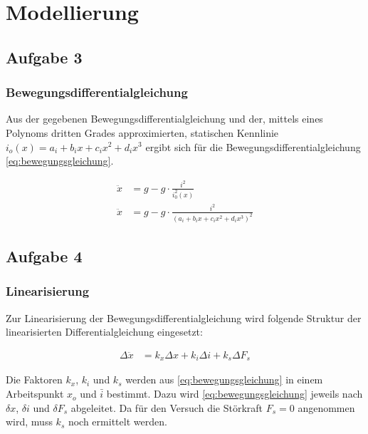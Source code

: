 \newcommand{\laplace}{%
  \tikz[baseline={(base)}, inner sep=0pt, outer sep=0pt]{
    \node[circle, fill, inner sep=1.5pt] (solid) at (0,0) {};
    \node[draw, circle, inner sep=1.5pt] (hollow) at (0,.5) {};
    \draw (solid) -- (hollow);
    \coordinate (base) at (0,0);
  }
}

\chapter{Modellierung}\label{chap:Modellierung}
\section{Aufgabe 3}\label{sec:Aufgabe3}
	\subsection*{Bewegungsdifferentialgleichung}\label{sub:diffeq}
	Aus der gegebenen Bewegungsdifferentialgleichung und der, mittels eines Polynoms dritten Grades approximierten, statischen Kennlinie $i_o(x) = a_i + b_ix +c_ix^2 + d_ix^3$ ergibt sich für die Bewegungsdifferentialgleichung \ref{eq:bewegungsgleichung}. 
	
	\begin{align}\label{eq:bewegungsgleichung}
		\ddot{x} &= g - g \cdot \frac{i^2}{i_0^2(x)} \nonumber\\
		\ddot{x} &= g - g \cdot \frac{i^2}{(a_i + b_ix +c_ix^2 + d_ix^3)^2}
	\end{align} 

\section{Aufgabe 4}\label{sec:Aufgabe4}
	\subsection*{Linearisierung}\label{sub:diffeq_lin}
	Zur Linearisierung der Bewegungsdifferentialgleichung wird folgende Struktur der linearisierten Differentialgleichung eingesetzt:

	\begin{align}\label{eq:lin_eq} 
		\Delta\ddot{x} &= k_x\Delta x + k_i\Delta i + k_s \Delta F_s
	\end{align} 

	Die Faktoren $k_x$, $k_i$ und $k_s$ werden aus \autoref{eq:bewegungsgleichung} in einem Arbeitspunkt $x_o$ und $\bar{i}$ bestimmt. Dazu wird \autoref{eq:bewegungsgleichung} jeweils nach $\delta x$, $\delta i$ und $\delta F_s$ abgeleitet. Da für den Versuch die Störkraft $F_s = 0$ angenommen wird, muss $k_s$ noch ermittelt werden. 


